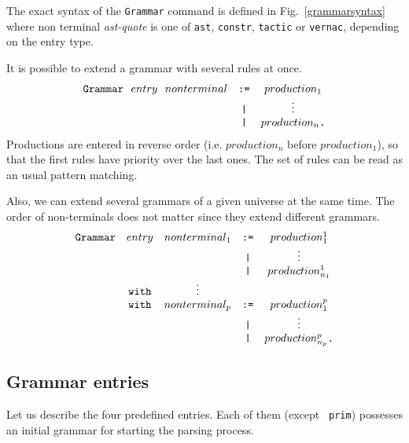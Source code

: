 The exact syntax of the {\tt Grammar} command is defined
in Fig.~\ref{grammarsyntax} where non terminal {\sl ast-quote} is one
of {\tt ast}, {\tt constr}, {\tt tactic} or {\tt vernac}, depending on
the entry type.

It is possible to extend a grammar with several rules at once.
$$
\begin{array}{rcc}
\verb+Grammar+~~entry~~nonterminal
        & \verb+:=+ & production_1 \\
        & \verb+|+  & \vdots    \\
        & \verb+|+  & production_n \verb+.+ \\
\end{array}
$$
Productions are entered in reverse order (i.e. $production_n$ before
$production_1$), so that the first rules have priority over the last
ones. The set of rules can be read as an usual pattern matching.

\noindent Also, we can extend several grammars of a given universe at
the same time. The order of non-terminals does not matter since they
extend different grammars.
$$
\begin{array}{rcccc}
\verb+Grammar+ & entry & nonterminal_1
                         & \verb+:=+ & production_1^1 \\
               &&        & \verb+|+  & \vdots    \\         
               &&        & \verb+|+  & production_{n_1}^1  \\
               & \verb+with+ & \vdots  && \\
               & \verb+with+ & nonterminal_p
                         & \verb+:=+ & production_1^p \\
               &&        & \verb+|+  & \vdots    \\         
               &&        & \verb+|+  & production_{n_p}^p \verb+.+ \\ 
\end{array}
$$


\subsection{Grammar entries}
\label{predefined-grammars}

Let us describe the four predefined entries. Each of them (except {\tt
prim}) possesses an initial grammar for starting the parsing process.

